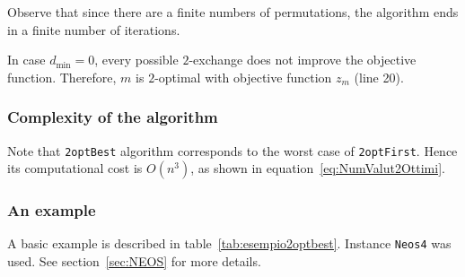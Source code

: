 Observe that since there are a finite numbers of permutations, the algorithm ends in a finite number of iterations.

In case $d_\mathrm{min}=0$, every possible $2$-exchange does not improve the objective function. Therefore, $m$ is $2$-optimal with objective function $z_m$ (line 20).

\subsubsection{Complexity of the algorithm}
Note that \texttt{2optBest} algorithm corresponds to the worst case of  \texttt{2optFirst}. Hence its computational cost is $O(n^3)$, as shown in equation~\eqref{eq:NumValut2Ottimi}.

\subsubsection{An example}
A basic example is described in table~\ref{tab:esempio2optbest}. Instance \texttt{Neos4} was used. See section~\ref{sec:NEOS} for more details.


